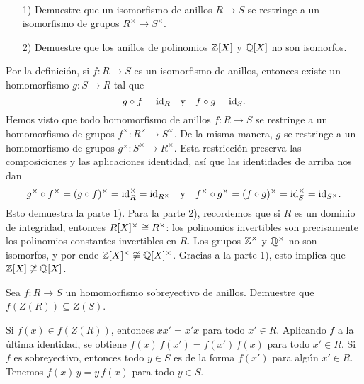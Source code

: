 \begin{ejercicio}
  ~

  \begin{enumerate}
  \item[1)] Demuestre que un isomorfismo de anillos $R\to S$ se restringe a
    un isomorfismo de grupos $R^\times \to S^\times$.

  \item[2)] Demuestre que los anillos de polinomios $\mathbb{Z} [X]$ y $\mathbb{Q} [X]$ no son
    isomorfos.
  \end{enumerate}

  \ifdefined\solutions
  \begin{solucion}
    Por la definición, si $f\colon R\to S$ es un isomorfismo de anillos,
    entonces existe un homomorfismo $g\colon S\to R$ tal que
    $$g\circ f = \mathrm{id}_{R} \quad\text{y}\quad f\circ g = \mathrm{id}_{S}.$$
    Hemos visto que todo homomorfismo de anillos $f\colon R\to S$ se restringe
    a un homomorfismo de grupos $f^\times\colon R^\times\to S^\times$.
    De la misma manera, $g$ se restringe a un homomorfismo de grupos
    $g^\times\colon S^\times \to R^\times$. Esta restricción preserva
    las composiciones y las aplicaciones identidad, así que las identidades
    de arriba nos dan
    \[ g^\times \circ f^\times = (g\circ f)^\times =
       \mathrm{id}_{R}^\times = \mathrm{id}_{R^\times}
       \quad\text{y}\quad
       f^\times\circ g^\times = (f\circ g)^\times =
       \mathrm{id}_{S}^\times = \mathrm{id}_{S^\times}. \]
    Esto demuestra la parte 1). Para la parte 2), recordemos que si $R$ es
    un dominio de integridad, entonces $R [X]^\times \cong R^\times$:
    los polinomios invertibles son precisamente los polinomios constantes
    invertibles en $R$. Los grupos $\mathbb{Z}^\times$ y $\mathbb{Q}^\times$ no son isomorfos,
    y por ende $\mathbb{Z} [X]^\times \not\cong \mathbb{Q} [X]^\times$. Gracias a la parte 1),
    esto implica que $\mathbb{Z} [X] \not\cong \mathbb{Q} [X]$.
  \end{solucion}
  \fi
\end{ejercicio}


\begin{ejercicio}
  Sea $f\colon R\to S$ un homomorfismo sobreyectivo de anillos. Demuestre que
  $f (Z (R)) \subseteq Z (S)$.

  \ifdefined\solutions
  \begin{solucion}
    Si $f (x) \in f (Z (R))$, entonces $xx' = x'x$ para todo
    $x'\in R$. Aplicando $f$ a la última identidad, se obtiene
    $f (x)\,f (x') = f (x')\,f(x)$ para todo $x'\in R$. Si $f$ es sobreyectivo,
    entonces todo $y\in S$ es de la forma $f (x')$ para algún $x'\in R$. Tenemos
    $f (x)\,y = y\,f(x)$ para todo $y\in S$.
  \end{solucion}
  \fi
\end{ejercicio}

